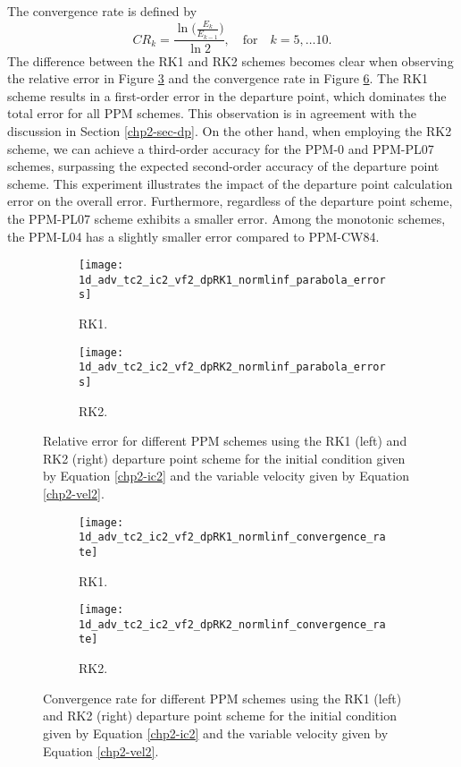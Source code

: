 The convergence rate is defined by
\begin{equation*}
	CR_k = \frac{\ln{\bigg(\frac{E_{k}}{E_{k-1}}}\bigg)}{\ln 2}, \quad \text{for} \quad k = 5, \ldots 10.
\end{equation*}
The difference between the RK1 and RK2 schemes becomes clear when observing the relative error in Figure \ref{chp2-sec-exp-adv2-2} and the convergence rate in Figure
\ref{chp2-sec-exp-adv2-3}.
The RK1 scheme results in a first-order error in the departure point, which dominates the total error for all PPM schemes.
This observation is in agreement with the discussion in Section \ref{chp2-sec-dp}.
On the other hand, when employing the RK2 scheme, we can achieve a third-order accuracy for the PPM-0 and PPM-PL07 schemes,
surpassing the expected second-order accuracy of the departure point scheme.
This experiment illustrates the impact of the departure point calculation error on the
overall error.
Furthermore, regardless of the departure point scheme, the PPM-PL07 scheme exhibits a smaller error.
Among the monotonic schemes, the PPM-L04 has a slightly smaller error compared to PPM-CW84.
\begin{figure}[!htb]
	\centering
	\begin{subfigure}{0.49\textwidth}
		\centering
		\texttt{[image: 1d\_adv\_tc2\_ic2\_vf2\_dpRK1\_normlinf\_parabola\_errors]}
		\caption{RK1.\label{chp2-sec-exp-adv2-error-rk1}}
	\end{subfigure}
	\begin{subfigure}{0.49\textwidth}
		\centering
		\texttt{[image: 1d\_adv\_tc2\_ic2\_vf2\_dpRK2\_normlinf\_parabola\_errors]}
		\caption{RK2.\label{chp2-sec-exp-adv2-rk3}}
	\end{subfigure}
	\caption{Relative error for different PPM schemes using the RK1 (left) and RK2 (right)
		departure point scheme for the initial condition given by Equation
		\eqref{chp2-ic2} and the variable 
		velocity given by Equation \eqref{chp2-vel2}.\label{chp2-sec-exp-adv2-2}}
\end{figure}

\begin{figure}[!htb]
	\centering
	\begin{subfigure}{0.49\textwidth}
		\centering
		\texttt{[image: 1d\_adv\_tc2\_ic2\_vf2\_dpRK1\_normlinf\_convergence\_rate]}
		\caption{RK1.\label{chp2-sec-exp-adv2-cr-rk1}}
	\end{subfigure}
	\begin{subfigure}{0.49\textwidth}
		\centering
		\texttt{[image: 1d\_adv\_tc2\_ic2\_vf2\_dpRK2\_normlinf\_convergence\_rate]}
		\caption{RK2.\label{chp2-sec-exp-adv2-cf-rk2}}
	\end{subfigure}
	\caption{Convergence rate for different PPM schemes using the RK1 (left) and RK2 (right)
		departure point scheme for the initial condition given by Equation
		\eqref{chp2-ic2} and the variable 
		velocity given by Equation \eqref{chp2-vel2}.\label{chp2-sec-exp-adv2-3}}
\end{figure}

